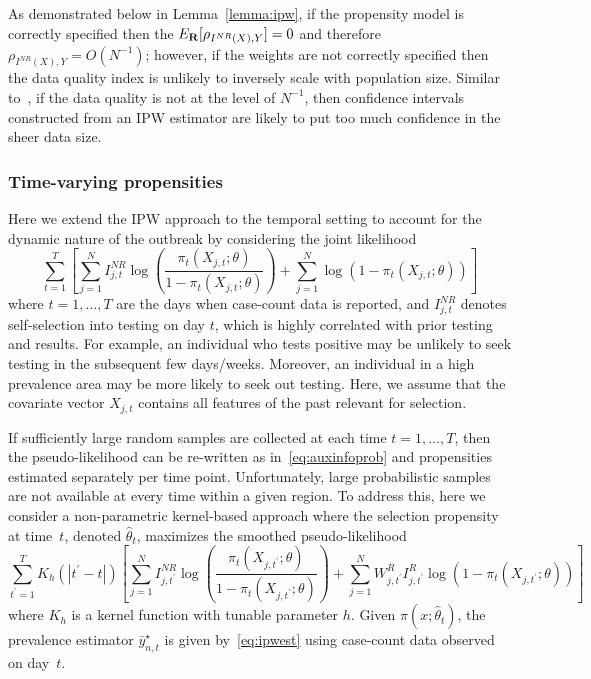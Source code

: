 \documentclass[11pt]{amsart}
\numberwithin{equation}{section}
\theoremstyle{plain}
\begin{document}
 As demonstrated below in Lemma~\ref{lemma:ipw}, if the propensity model is correctly specified then the $E_{\bf R} [ \rho_{I^{NR} (X), Y} ] = 0$ and therefore $\rho_{I^{NR} (X), Y} = O(N^{-1})$; however, if the weights are not correctly specified then the data quality index is unlikely to inversely scale with population size.
 Similar to~\cite{Meng2018}, if the data quality is not at the level of $N^{-1}$, then confidence intervals constructed from an IPW estimator are likely to put too much confidence in the sheer data size.

 \subsubsection{Time-varying propensities}

 Here we extend the IPW approach to the temporal setting to account for the dynamic nature of the outbreak by considering the joint likelihood
 \begin{equation}
 \label{eq:tvpropensity}
 \sum_{t=1}^T \left[ \sum_{j=1}^N I^{NR}_{j,t} \log \left( \frac{\pi_t (X_{j,t}; \theta)}{1-\pi_t(X_{j,t}; \theta)} \right) + \sum_{j=1}^N \log \left( 1 - \pi_t (X_{j,t}; \theta) \right) \right]
 \end{equation}
 where $t=1,\ldots,T$ are the days when case-count data is reported, and $I^{NR}_{j,t}$ denotes self-selection into testing on day $t$, which is highly correlated with prior testing and results.  For example, an individual who tests positive may be unlikely to seek testing in the subsequent few days/weeks.  Moreover, an individual in a high prevalence area may be more likely to seek out testing.  Here, we assume that the covariate vector $X_{j,t}$ contains all features of the past relevant for selection.

 If sufficiently large random samples are collected at each time $t =1,\ldots,T$, then the pseudo-likelihood can be re-written as in~\eqref{eq:auxinfoprob} and propensities estimated separately per time point.  Unfortunately, large probabilistic samples are not available at every time within a given region.  To address this, here we consider a non-parametric kernel-based approach where the selection propensity at time~$t$, denoted $\hat \theta_t$, maximizes the smoothed pseudo-likelihood
 $$
 \sum_{t^\prime=1}^T K_h(|t^\prime - t|) \left[ \sum_{j=1}^N I_{j,t^\prime}^{NR} \log \left( \frac{\pi_t (X_{j,t^\prime}; \theta)}{1-\pi_t(X_{j,t^\prime}; \theta)} \right) + \sum_{j=1}^N W^{R}_{j,t^\prime} I^R_{j,t^\prime} \log \left( 1 - \pi_t (X_{j,t^\prime}; \theta) \right) \right]
 $$
 where $K_h$ is a kernel function with tunable parameter $h$. Given $\pi (x;\hat \theta_t)$, the prevalence estimator $\bar y_{n,t}^\star$ is given by~\ref{eq:ipwest} using case-count data observed on day~$t$.
\end{document}
